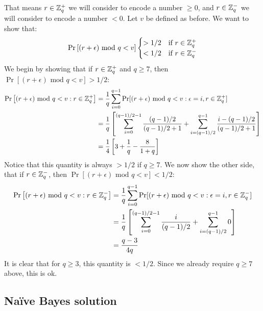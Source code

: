 \documentclass[11pt]{article}
\begin{document}
That means $r \in {\mathbb Z}_q^+$ we will consider to encode a number $\geq 0$, and
$r \in {\mathbb Z}_q^-$ we will consider to encode a number $< 0$. Let $v$ be defined
as before. We want to show that:
\begin{align*}
    \Pr\left[ (r+\epsilon) \text{ mod } q < v\right]
    \begin{cases}
        > 1/2 & \mbox{if } r\in{\mathbb Z}_q^+  \\
        < 1/2 & \mbox{if } r\in{\mathbb Z}_q^-
    \end{cases}
\end{align*}
We begin by showing that if $r \in {\mathbb Z}_q^+$ and $q \geq 7$, then
$\Pr\left[(r+\epsilon)\text{ mod }q<v\right] > 1/2$:
\begin{align*}
    \Pr\left[(r+\epsilon)\text{ mod }q<v : r \in {\mathbb Z}_q^+ \right] &=
        \frac{1}{q}\sum\limits_{i=0}^{q-1}\Pr[(r+\epsilon)\text{ mod }q<v : \epsilon=i, r\in {\mathbb Z}_q^+ ] \\
        &= \frac{1}{q}\left[ \sum\limits_{i=0}^{(q-1)/2-1} \frac{(q-1)/2}{(q-1)/2+1} + \sum\limits_{i=(q-1)/2}^{q-1} \frac{i-(q-1)/2}{(q-1)/2+1} \right] \\
        &= \frac{1}{4}\left[3+\frac{1}{q}-\frac{8}{1+q}\right]
\end{align*}
Notice that this quantity is always $> 1/2$ if $q \geq 7$. We now show the other side, that
if $r \in {\mathbb Z}_q^-$, then $\Pr\left[(r+\epsilon)\text{ mod }q<v\right] < 1/2$:
\begin{align*}
    \Pr\left[(r+\epsilon)\text{ mod }q<v:r\in{\mathbb Z}_q^-\right] &=
        \frac{1}{q}\sum\limits_{i=0}^{q-1}\Pr[(r+\epsilon)\text{ mod }q<v : \epsilon=i,r\in{\mathbb Z}_q^-] \\
        &= \frac{1}{q}\left[ \sum\limits_{i=0}^{(q-1)/2-1} \frac{i}{(q-1)/2} + \sum\limits_{i=(q-1)/2}^{q-1} 0 \right] \\
        &= \frac{q-3}{4q}
\end{align*}
It is clear that for $q \geq 3$, this quantity is $< 1/2$. Since we already
require $q \geq 7$ above, this is ok.




\subsection{Na\"ive Bayes solution}
\end{document}
